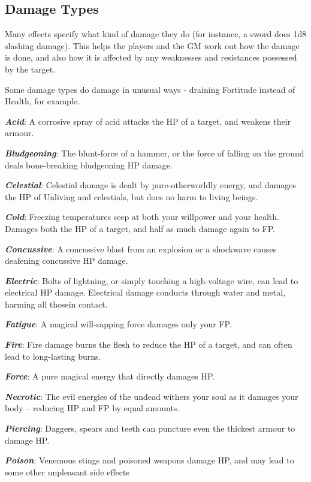 \subsection{Damage Types}



Many effects specify what kind of damage they do (for instance, a sword does 1d8 slashing damage). This helps the players and the GM work out how the damage is done, and also how it is affected by any weaknesses and resistances possessed by the target. 

Some damage types do damage in unusual ways - draining Fortitude instead of Health, for example. 

\newcommand\damage[2]
{
\textbf{ \textit{#1}}: #2
}

\damage{Acid}{A corrosive spray of acid attacks the HP of a target, and weakens their armour.}

\damage{Bludgeoning}{The blunt-force of a hammer, or the force of falling on the ground deals bone-breaking bludgeoning HP damage.}

\damage{Celestial}{Celestial damage is dealt by pure-otherworldly energy, and damages the HP of Unliving and celestials, but does no harm to living beings.}

\damage{Cold}{Freezing temperatures seep at both your willpower and your health. Damages both the HP of a target, and half as much damage again to FP. } 

\damage{Concussive}{A concussive blast from an explosion or a shockwave causes deafening concussive HP damage.}

\damage{Electric}{Bolts of lightning, or simply touching a high-voltage wire, can lead to electrical HP damage. Electrical damage conducts through water and metal, harming all thosein contact.}

\damage{Fatigue}{A magical will-sapping force damages only your FP.}

\damage{Fire}{Fire damage burns the flesh to reduce the HP of a target, and can often lead to long-lasting burns.}

\damage{Force}{A pure magical energy that directly damages HP.}

\damage{Necrotic}{The evil energies of the undead withers your soul as it damages your body -- reducing HP and FP by equal amounts.}

\damage{Piercing}{Daggers, spears and teeth can puncture even the thickest armour to damage HP.}

\damage{Poison}{Venemous stings and poisoned weapons damage HP, and may lead to some other unpleasant side effects}

